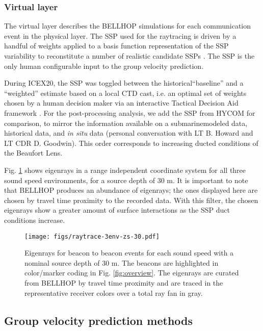 \subsubsection{Virtual layer}
The virtual layer describes the BELLHOP simulations for each communication event in the physical layer.
The SSP used for the raytracing is driven by a handful of weights applied to a basis function representation
of the SSP variability to reconstitute a number of realistic candidate SSPs \citep{leblanc_underwater_1980,lin_merging_2010}.
The SSP is the only human configurable input to the group velocity prediction.

During ICEX20, the SSP was toggled between the historical``baseline'' and a ``weighted'' estimate based on a local CTD cast, i.e. an optimal set of weights chosen by a human decision maker via an interactive Tactical Decision Aid framework \citep{bhatt_embedded_2021}.
For the post-processing analysis, we add the SSP from HYCOM for comparison, to mirror the information available on a submarine\textemdash modeled data, historical data, and \textit{in situ} data (personal conversation with LT B. Howard and LT CDR D. Goodwin).
This order corresponds to increasing ducted conditions of the Beaufort Lens.

Fig. \ref{fig:raytrace-zs30} shows eigenrays in a range independent coordinate system for all three sound speed environments, for a source depth of 30 m.
It is important to note that BELLHOP produces an abundance of eigenrays; the ones displayed here are chosen by travel time proximity to the recorded data.
With this filter, the chosen eigenrays show a greater amount of surface interactions as the SSP duct conditions increase.

\begin{figure}[h!]
  \centering
  \texttt{[image: figs/raytrace-3env-zs-30.pdf]}
  \caption{Eigenrays for beacon to beacon events for each sound speed with a nominal source depth of 30 m. The beacons are highlighted in color/marker coding in Fig. \ref{fig:overview}. The eigenrays are curated from BELLHOP by travel time proximity and are traced in the representative receiver colors over a total ray fan in gray.}
  \label{fig:raytrace-zs30}
  \end{figure}

\FloatBarrier
\subsection{Group velocity prediction methods}

